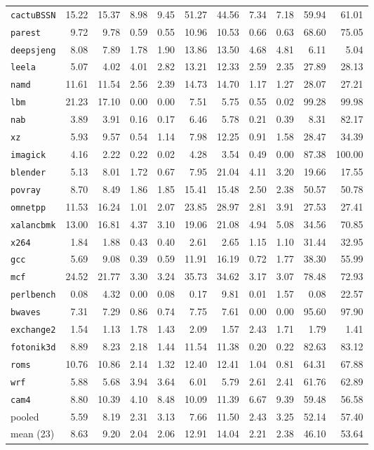 \documentclass[10pt,a4paper]{article}
\newcommand{\ct}[1]{\texttt{#1}}
\begin{document}
{\begin{longtable}{@{}lrrrrrrrrrr@{}}
\bottomrule
\endlastfoot
\ct{cactuBSSN} & 15.22 & 15.37 & 8.98 & 9.45 & 51.27 & 44.56 & 7.34 & 7.18 & 59.94 & 61.01 \\
\ct{parest} & 9.72 & 9.78 & 0.59 & 0.55 & 10.96 & 10.53 & 0.66 & 0.63 & 68.60 & 75.05 \\
\ct{deepsjeng} & 8.08 & 7.89 & 1.78 & 1.90 & 13.86 & 13.50 & 4.68 & 4.81 & 6.11 & 5.04 \\
\ct{leela} & 5.07 & 4.02 & 4.01 & 2.82 & 13.21 & 12.33 & 2.59 & 2.35 & 27.89 & 28.13 \\
\ct{namd} & 11.61 & 11.54 & 2.56 & 2.39 & 14.73 & 14.70 & 1.17 & 1.27 & 28.07 & 27.21 \\
\ct{lbm} & 21.23 & 17.10 & 0.00 & 0.00 & 7.51 & 5.75 & 0.55 & 0.02 & 99.28 & 99.98 \\
\ct{nab} & 3.89 & 3.91 & 0.16 & 0.17 & 6.46 & 5.78 & 0.21 & 0.39 & 8.31 & 82.17 \\
\ct{xz} & 5.93 & 9.57 & 0.54 & 1.14 & 7.98 & 12.25 & 0.91 & 1.58 & 28.47 & 34.39 \\
\ct{imagick} & 4.16 & 2.22 & 0.22 & 0.02 & 4.28 & 3.54 & 0.49 & 0.00 & 87.38 & 100.00 \\
\ct{blender} & 5.13 & 8.01 & 1.72 & 0.67 & 7.95 & 21.04 & 4.11 & 3.20 & 19.66 & 17.55 \\
\ct{povray} & 8.70 & 8.49 & 1.86 & 1.85 & 15.41 & 15.48 & 2.50 & 2.38 & 50.57 & 50.78 \\
\ct{omnetpp} & 11.53 & 16.24 & 1.01 & 2.07 & 23.85 & 28.97 & 2.81 & 3.91 & 27.53 & 27.41 \\
\ct{xalancbmk} & 13.00 & 16.81 & 4.37 & 3.10 & 19.06 & 21.08 & 4.94 & 5.08 & 34.56 & 70.85 \\
\ct{x264} & 1.84 & 1.88 & 0.43 & 0.40 & 2.61 & 2.65 & 1.15 & 1.10 & 31.44 & 32.95 \\
\ct{gcc} & 5.69 & 9.08 & 0.39 & 0.59 & 11.91 & 16.19 & 0.72 & 1.77 & 38.30 & 55.99 \\
\ct{mcf} & 24.52 & 21.77 & 3.30 & 3.24 & 35.73 & 34.62 & 3.17 & 3.07 & 78.48 & 72.93 \\
\ct{perlbench} & 0.08 & 4.32 & 0.00 & 0.08 & 0.17 & 9.81 & 0.01 & 1.57 & 0.08 & 22.57 \\
\ct{bwaves} & 7.31 & 7.29 & 0.86 & 0.74 & 7.75 & 7.61 & 0.00 & 0.00 & 95.60 & 97.90 \\
\ct{exchange2} & 1.54 & 1.13 & 1.78 & 1.43 & 2.09 & 1.57 & 2.43 & 1.71 & 1.79 & 1.41 \\
\ct{fotonik3d} & 8.89 & 8.23 & 2.18 & 1.44 & 11.54 & 11.38 & 0.20 & 0.22 & 82.63 & 83.12 \\
\ct{roms} & 10.76 & 10.86 & 2.14 & 1.32 & 12.40 & 12.41 & 1.04 & 0.81 & 64.31 & 67.88 \\
\ct{wrf} & 5.88 & 5.68 & 3.94 & 3.64 & 6.01 & 5.79 & 2.61 & 2.41 & 61.76 & 62.89 \\
\ct{cam4} & 8.80 & 10.39 & 4.10 & 8.48 & 10.09 & 11.39 & 6.67 & 9.39 & 59.48 & 56.58 \\
\midrule
pooled & 5.59 & 8.19 & 2.31 & 3.13 & 7.66 & 11.50 & 2.43 & 3.25 & 52.14 & 57.40 \\
mean (23) & 8.63 & 9.20 & 2.04 & 2.06 & 12.91 & 14.04 & 2.21 & 2.38 & 46.10 & 53.64 \\
\end{longtable}
}
\end{document}
